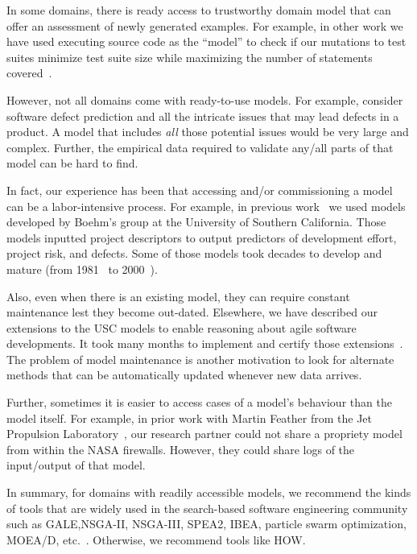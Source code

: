 \documentclass[conference]{IEEEtran}
\begin{document}
In some domains, there is ready access to 
trustworthy domain model that can offer an assessment
of newly generated examples. For example, in other work
we have used executing source code as the ``model'' to check
if our mutations to test suites
  minimize
test suite size while maximizing the number of statements covered~\cite{me09m,andrews07,andrews10}.

However, not all domains come with ready-to-use models. For example, 
consider software defect prediction and all the intricate issues that may lead defects in a product. A model that includes {\em all} those
potential issues would be very large and complex. Further,
the empirical data required to validate any/all parts
of that model can be hard to find.



In fact, our experience has been that accessing and/or commissioning
a model can be a labor-intensive process.
For  example, in previous work~\cite{me07f} we used models
developed by Boehm's group at the University of Southern California.
Those models inputted project descriptors to output predictors
of development effort, project risk, and defects.
Some of those models took decades to develop and mature (from 1981~\cite{boehm81} to 2000~\cite{boehm00b}). 

Also, even when there is an existing model, they can require
constant  maintenance lest they become out-dated. Elsewhere, we have described our
extensions to the USC models to enable reasoning about agile software developments. 
It took many months to implement and certify those extensions~\cite{me09i,me09j}.
The problem of model maintenance is another
motivation to look for alternate methods that can be automatically updated whenever new data arrives.

Further, sometimes  it is easier to access cases of a model's behaviour than the model
itself. For example, in prior work with Martin  Feather from the Jet Propulsion
Laboratory~\cite{fea02a},  our research partner could not share a
propriety model from within the NASA firewalls. However, they could share 
logs of the input/output of that model.

In summary, for domains with readily accessible models, we recommend
the kinds of tools that are widely used in the search-based
software engineering community such as GALE,NSGA-II, NSGA-III, SPEA2, IBEA, particle swarm optimization, MOEA/D, etc.~\cite{krall14,deb00a,zit02,zit04,%
deb14,Cui2005a,zhang07:TEC}. Otherwise, we recommend tools like HOW.
\end{document}
